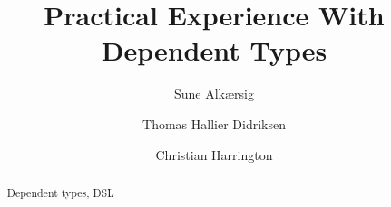 \documentclass[oribibl, fleqn]{llncs}
\newcommand{\keywords}[1]{\par\addvspace\baselineskip
\noindent\keywordname\enspace\ignorespaces#1}
\begin{document}
\mainmatter
\title{Practical Experience With Dependent Types}
\author{Sune Alkærsig \and Thomas Hallier Didriksen \and Christian Harrington \\
}

\maketitle
\begin{abstract}

\keywords{Dependent types, DSL}
\end{abstract}














\clearpage %
\appendix
\end{document}

